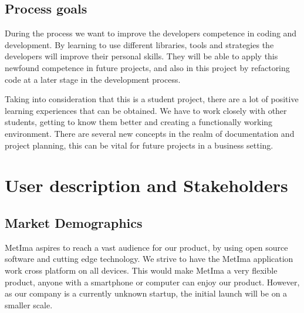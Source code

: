 \documentclass{article}
\begin{document}
\subsection{Process goals}
During the process we want to improve the developers competence in coding and development. By learning to use different libraries, tools and strategies the developers will improve their personal skills. They will be able to apply this newfound competence in future projects, and also in this project by refactoring code at a later stage in the development process. 

Taking into consideration that this is a student project, there are a lot of positive learning experiences that can be obtained. We have to work closely with other students, getting to know them better and creating a functionally working environment. There are several new concepts in the realm of documentation and project planning, this can be vital for future projects in a business setting.

\section{User description and Stakeholders}
\subsection{Market Demographics}
MetIma aspires to reach a vast audience for our product, by using open source software and cutting edge technology. We strive to have the MetIma application work cross platform on all devices. This would make MetIma a very flexible product, anyone with a smartphone or computer can enjoy our product. However, as our company is a currently unknown startup, the initial launch will be on a smaller scale.
\end{document}
